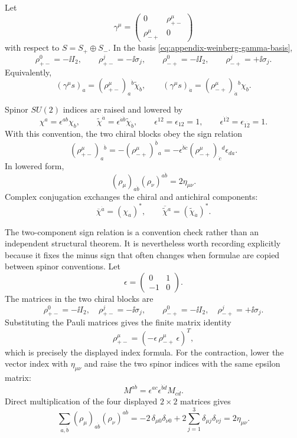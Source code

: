 \begin{definition}
\label{def:two-component-block-epsilon-conventions}
Let
\[
  \gamma^\mu
  =
  \begin{pmatrix}
    0&\rho^\mu_{+-}\\
    \rho^\mu_{-+}&0
  \end{pmatrix}
\]
with respect to \(S=S_+\oplus S_-\).  In the basis
\eqref{eq:appendix-weinberg-gamma-basis},
\[
  \rho^0_{+-}=-\ii I_2,
  \qquad
  \rho^j_{+-}=-\ii\sigma_j,
  \qquad
  \rho^0_{-+}=-\ii I_2,
  \qquad
  \rho^j_{-+}=+\ii\sigma_j .
\]
Equivalently,
\[
  (\gamma^\mu s)_a=(\rho^\mu_{+-})_a{}^{\dot b}
  \widetilde\chi_{\dot b},
  \qquad
  (\gamma^\mu s)_{\dot a}=(\rho^\mu_{-+})_{\dot a}{}^b\chi_b .
\]

Spinor \(SU(2)\) indices are raised and lowered by
\[
  \chi^a=\epsilon^{ab}\chi_b,
  \qquad
  \widetilde\chi^{\dot a}
  =
  \epsilon^{\dot a\dot b}\widetilde\chi_{\dot b},
  \qquad
  \epsilon^{12}=\epsilon_{12}=1,
  \qquad
  \epsilon^{\dot1\dot2}=\epsilon_{\dot1\dot2}=1 .
\]
With this convention, the two chiral blocks obey the sign relation
\begin{equation}
  (\rho^\mu_{+-})_a{}^{\dot b}
  =
  -(\rho^\mu_{-+})^{\dot b}{}_a
  =
  -\epsilon^{\dot b\dot c}
  (\rho^\mu_{-+})_{\dot c}{}^d
  \epsilon_{da}.
  \label{eq:appendix-rho-sign-relation}
\end{equation}
In lowered form,
\[
  (\rho_\mu)_{a\dot b}(\rho_\nu)^{a\dot b}
  =
  2\eta_{\mu\nu}.
\]
Complex conjugation exchanges the chiral and antichiral components:
\[
  \overline\chi{}^{\dot a}=(\chi_a)^*,
  \qquad
  \overline{\widetilde\chi}{}^{a}
  =
  (\widetilde\chi_{\dot a})^* .
\]
\end{definition}

The two-component sign relation is a convention check rather than an
independent structural theorem.  It is nevertheless worth recording explicitly
because it fixes the minus sign that often changes when formulae are copied
between spinor conventions.  Let
\[
  \epsilon=
  \begin{pmatrix}0&1\\-1&0\end{pmatrix}.
\]
The matrices in the two chiral blocks are
\[
  \rho^0_{+-}=-\ii I_2,\quad \rho^j_{+-}=-\ii\sigma_j,
  \qquad
  \rho^0_{-+}=-\ii I_2,\quad \rho^j_{-+}=+\ii\sigma_j .
\]
Substituting the Pauli matrices gives the finite matrix identity
\[
  \rho^\mu_{+-}
  =
  \left(-\epsilon\,\rho^\mu_{-+}\,\epsilon\right)^T,
\]
which is precisely the displayed index formula.  For the contraction, lower
the vector index with \(\eta_{\mu\nu}\) and raise the two spinor indices with
the same epsilon matrix:
\[
  M^{a\dot b}=\epsilon^{ac}\epsilon^{\dot b\dot d}M_{c\dot d}.
\]
Direct multiplication of the four displayed \(2\times2\) matrices gives
\[
  \sum_{a,\dot b}(\rho_\mu)_{a\dot b}(\rho_\nu)^{a\dot b}
  =
  -2\,\delta_{\mu0}\delta_{\nu0}
  +2\sum_{j=1}^3\delta_{\mu j}\delta_{\nu j}
  =
  2\eta_{\mu\nu}.
\]

